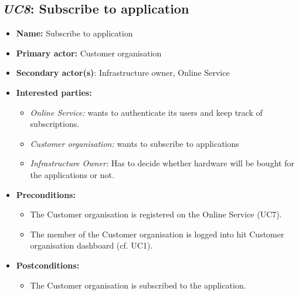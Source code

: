 \subsection{\emph{UC8}: Subscribe to application}
\begin{itemize}
    \item \textbf{Name:} Subscribe to application
    \item \textbf{Primary actor:} Customer organisation
    \item \textbf{Secondary actor(s)}: Infrastructure owner, Online Service
    \item \textbf{Interested parties:} 
        \begin{itemize}
            \item \textit{Online Service:} wants to authenticate its users and keep track of subscriptions.
            \item \textit{Customer organisation:} wants to subscribe to applications
            \item \textit{Infrastructure Owner:} Has to decide whether hardware will be bought for the applications or not.
        \end{itemize}

    \item \textbf{Preconditions:}
        \begin{itemize}
            \item The Customer organisation is registered on the Online Service (UC7).
            \item The member of the Customer organisation is logged into hit Customer organisation dashboard (cf. UC1).
        \end{itemize}

    \item \textbf{Postconditions:}
        \begin{itemize}
            \item The Customer organisation is subscribed to the application.

        \end{itemize}


\end{itemize}
